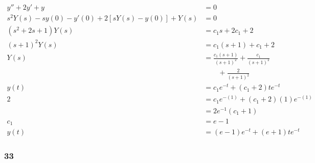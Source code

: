 \documentclass{article}
\begin{document}
\begin{align*}
  y'' + 2 y' + y                                       & = 0                                                     \\
  s^2 Y(s) - s y(0) - y'(0) + 2 [s Y(s) - y(0)] + Y(s) & = 0                                                     \\
  (s^2 + 2 s + 1) Y(s)                                 & = c_1 s + 2 c_1 + 2                                     \\
  (s + 1)^2 Y(s)                                       & = c_1 (s + 1) + c_1 + 2                                 \\
  Y(s)                                                 & = \frac{c_1 (s + 1)}{(s + 1)^2} + \frac{c_1}{(s + 1)^2} \\
                                                       & \qquad + \frac{2}{(s + 1)^2}                            \\
  y(t)                                                 & = c_1 e^{-t} + (c_1 + 2) t e^{-t}                       \\
  2                                                    & = c_1 e^{-(1)} + (c_1 + 2) (1) e^{-(1)}                 \\
                                                       & = 2 e^{-1} (c_1 + 1)                                    \\
  c_1                                                  & = e - 1                                                 \\
  y(t)                                                 & = (e - 1) e^{-t} + (e + 1) t e^{-t}
\end{align*}

\subsubsection{33}

\end{document}
